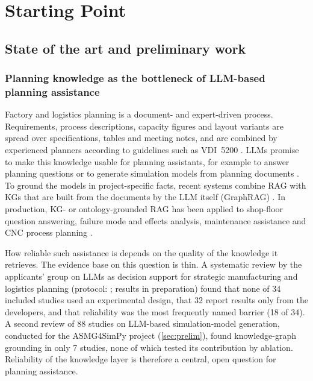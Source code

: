 \section{Starting Point}
\subsection{State of the art and preliminary work}\label{sec:stateoftheart}

\subsubsection{Planning knowledge as the bottleneck of LLM-based planning assistance}

Factory and logistics planning is a document- and expert-driven process. Requirements, process descriptions, capacity figures and layout variants are spread over specifications, tables and meeting notes, and are combined by experienced planners according to guidelines such as VDI~5200 \parencite{vdi5200,wiendahl2015handbook}. \Acp{LLM} promise to make this knowledge usable for planning assistants, for example to answer planning questions or to generate simulation models from planning documents \parencite{ferry2025anwendung,schmitt2026llm,kraemer2026automated,kute2025generative}. To ground the models in project-specific facts, recent systems combine \ac{RAG} with \acp{KG} that are built from the documents by the \ac{LLM} itself (\ac{GraphRAG}) \parencite{edge2024local,peng2026survey}. In production, \ac{KG}- or ontology-grounded \ac{RAG} has been applied to shop-floor question answering, failure mode and effects analysis, maintenance assistance and CNC process planning \parencite{wan2025hybrid,bahr2025fmea,ludwig2025ontology,hoang2025arkness}.

How reliable such assistance is depends on the quality of the knowledge it retrieves. The evidence base on this question is thin. A systematic review by the applicants' group on \acp{LLM} as decision support for strategic manufacturing and logistics planning (protocol: \cite{reider2026slrprotocol}; results in preparation) found that none of 34 included studies used an experimental design, that 32 report results only from the developers, and that reliability was the most frequently named barrier (18 of 34). A second review of 88 studies on \ac{LLM}-based simulation-model generation, conducted for the ASMG4SimPy project (\autoref{sec:prelim}), found knowledge-graph grounding in only 7 studies, none of which tested its contribution by ablation. Reliability of the knowledge layer is therefore a central, open question for planning assistance.

